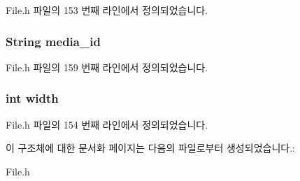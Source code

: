 File.\-h 파일의 153 번째 라인에서 정의되었습니다.

\hypertarget{struct___image_extends_af61699ef5054dcf075cbf29d59ed8d3c}{
\subsubsection[{media\-\_\-id}]{\setlength{\rightskip}{0pt plus 5cm}String media\-\_\-id}}\label{struct___image_extends_af61699ef5054dcf075cbf29d59ed8d3c}


File.\-h 파일의 159 번째 라인에서 정의되었습니다.

\hypertarget{struct___image_extends_a2474a5474cbff19523a51eb1de01cda4}{
\subsubsection[{width}]{\setlength{\rightskip}{0pt plus 5cm}int width}}\label{struct___image_extends_a2474a5474cbff19523a51eb1de01cda4}


File.\-h 파일의 154 번째 라인에서 정의되었습니다.



이 구조체에 대한 문서화 페이지는 다음의 파일로부터 생성되었습니다.\-:\begin{DoxyCompactItemize}
\item 
File.\-h\end{DoxyCompactItemize}
